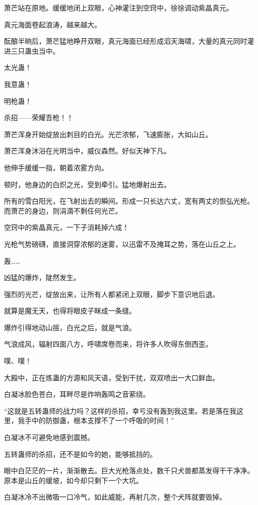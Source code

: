 \begin{this_body}
萧芒站在原地。缓缓地闭上双眼，心神灌注到空窍中，徐徐调动紫晶真元。

真元海面卷起浪涛，越来越大。

酝酿半晌后，萧芒猛地睁开双眼，真元海面已经形成滔天海啸，大量的真元同时灌进三只蛊虫当中。

太光蛊！

我意蛊！

明枪蛊！

杀招——荣耀吾枪！！

萧芒浑身开始绽放出刺目的白光。光芒浓郁，飞速膨胀，大如山丘。

萧芒浑身沐浴在光明当中，威仪森然。好似天神下凡。

他伸手缓缓一指，朝着浓雾方向。

顿时，他身边的白炽之光，受到牵引。猛地爆射出去。

所有的雪白阳光，在飞射出去的瞬间。形成一只长达六丈，宽有两丈的恢弘光枪。而萧芒的身边，则涓滴不剩任何光芒。

空窍中的紫晶真元，一下子消耗掉六成！

光枪气势磅礴，直接洞穿浓郁的迷雾，以迅雷不及掩耳之势，落在山丘之上。

轰……

凶猛的爆炸，陡然发生。

强烈的光芒，绽放出来，让所有人都紧闭上双眼，脚步下意识地后退。

就算是魔无天，也得将眼皮子眯成一条缝。

爆炸引得地动山摇，白光之后，就是气浪。

气浪成风，辐射四面八方，呼啸席卷而来，将许多人吹得东倒西歪。

噗、噗！

大殿中，正在炼蛊的方源和风天语，受到干扰，双双喷出一大口鲜血。

白凝冰脸色苍白，耳畔尽是炸响轰鸣之音萦绕。

“这就是五转蛊师的战力吗？这样的杀招，幸亏没有轰到我这里。若是落在我这里，我手中的防御蛊，根本支撑不了一个呼吸的时间！”

白凝冰不可避免地感到震撼。

五转蛊师的杀招，还不是如今的她，能够抵挡的。

眼中白茫茫的一片，渐渐散去。巨大光枪落点处，数千只犬兽都蒸发得干干净净。原本是山丘的缓坡，如今却只剩下一个大坑。

白凝冰冷不出微吸一口冷气，如此威能，再射几次，整个犬阵就要毁掉。


\end{this_body}
